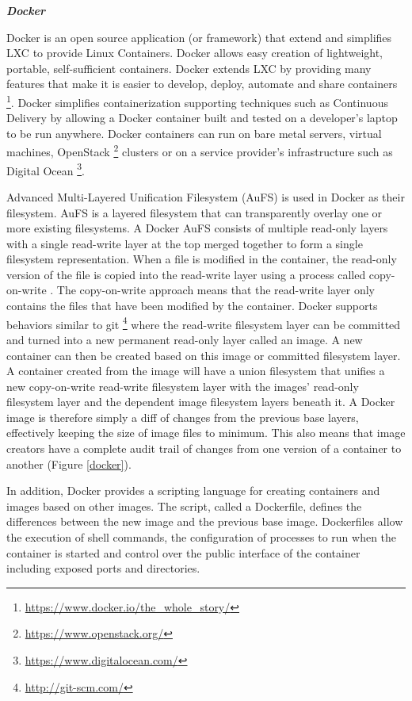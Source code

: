 \documentclass[a4paper,11pt,twoside]{article}
\begin{document}

\noindent
\textbf{\textit{Docker}}

\noindent
Docker is an open source application (or framework) that extend and simplifies LXC to provide Linux Containers. Docker allows easy creation of lightweight, portable, self-sufficient containers. Docker extends LXC by providing many features that make it is easier to develop, deploy, automate and share containers \footnote{\label{dockerB} \url{https://www.docker.io/the_whole_story/}}. Docker simplifies containerization supporting techniques such as Continuous Delivery by allowing a Docker container built and tested on a developer's laptop to be run anywhere. Docker containers can run on bare metal servers, virtual machines, OpenStack \footnote{\url{https://www.openstack.org/}} clusters or on a service provider's infrastructure such as Digital Ocean \footnote{\url{https://www.digitalocean.com/}}. 

Advanced Multi-Layered Unification Filesystem (AuFS) is used in Docker as their filesystem. AuFS is a layered filesystem that can transparently overlay one or more existing filesystems. A Docker AuFS consists of multiple read-only layers with a single read-write layer at the top merged together to form a single filesystem representation. When a file is modified in the container, the read-only version of the file is copied into the read-write layer using a process called copy-on-write \cite{docker2}. The copy-on-write approach means that the read-write layer only contains the files that have been modified by the container. Docker supports behaviors similar to git \footnote {\url{http://git-scm.com/}} where the read-write filesystem layer can be committed and turned into a new permanent read-only layer called an image. A new container can then be created based on this image or committed filesystem layer. A container created from the image will have a union filesystem that unifies a new copy-on-write read-write filesystem layer with the images' read-only filesystem layer and the dependent image filesystem layers beneath it. A Docker image is therefore simply a diff of changes from the previous base layers, effectively keeping the size of image files to minimum. This also means that image creators have a complete audit trail of changes from one version of a container to another (Figure \ref{docker}). 

In addition,  Docker provides a scripting language for creating containers and images based on other images. The script, called a Dockerfile, defines the differences between the new image and the previous base image. Dockerfiles allow the execution of shell commands, the configuration of processes to run when the container is started and control over the public interface of the container including exposed ports and directories. 
\end{document}
